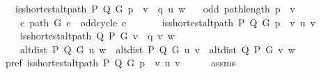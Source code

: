 \begin{isabellebody}
\ \ \ {\isachardoublequoteopen}is{\isacharunderscore}{\kern0pt}shortest{\isacharunderscore}{\kern0pt}alt{\isacharunderscore}{\kern0pt}path\ P\ Q\ G\ {\isacharparenleft}{\kern0pt}p\ {\isacharat}{\kern0pt}\ v\ {\isacharhash}{\kern0pt}\ q{\isacharparenright}{\kern0pt}\ u\ w{\isachardoublequoteclose}\isanewline
\ \ \ {\isachardoublequoteopen}odd\ {\isacharparenleft}{\kern0pt}path{\isacharunderscore}{\kern0pt}length\ {\isacharparenleft}{\kern0pt}p\ {\isacharat}{\kern0pt}\ {\isacharbrackleft}{\kern0pt}v{\isacharbrackright}{\kern0pt}{\isacharparenright}{\kern0pt}{\isacharparenright}{\kern0pt}{\isachardoublequoteclose}\isanewline
\ \ \ {\isachardoublequoteopen}{\isasymnot}\ {\isacharparenleft}{\kern0pt}{\isasymexists}c{\isachardot}{\kern0pt}\ path\ G\ c\ {\isasymand}\ odd{\isacharunderscore}{\kern0pt}cycle\ c{\isacharparenright}{\kern0pt}{\isachardoublequoteclose}\isanewline
\ \ \isanewline
\ \ \ \ {\isachardoublequoteopen}is{\isacharunderscore}{\kern0pt}shortest{\isacharunderscore}{\kern0pt}alt{\isacharunderscore}{\kern0pt}path\ P\ Q\ G\ {\isacharparenleft}{\kern0pt}p\ {\isacharat}{\kern0pt}\ {\isacharbrackleft}{\kern0pt}v{\isacharbrackright}{\kern0pt}{\isacharparenright}{\kern0pt}\ u\ v{\isachardoublequoteclose}\isanewline
\ \ \ \ {\isachardoublequoteopen}is{\isacharunderscore}{\kern0pt}shortest{\isacharunderscore}{\kern0pt}alt{\isacharunderscore}{\kern0pt}path\ Q\ P\ G\ {\isacharparenleft}{\kern0pt}v\ {\isacharhash}{\kern0pt}\ q{\isacharparenright}{\kern0pt}\ v\ w{\isachardoublequoteclose}\isanewline
\ \ \ \ {\isachardoublequoteopen}alt{\isacharunderscore}{\kern0pt}dist\ P\ Q\ G\ u\ w\ {\isacharequal}{\kern0pt}\ alt{\isacharunderscore}{\kern0pt}dist\ P\ Q\ G\ u\ v\ {\isacharplus}{\kern0pt}\ alt{\isacharunderscore}{\kern0pt}dist\ Q\ P\ G\ v\ w{\isachardoublequoteclose}%
\endisataginvisible
{\isafoldinvisible}%
%
\isadeliminvisible
\isanewline
%
\endisadeliminvisible
%
\isadelimproof
%
\endisadelimproof
%
\isatagproof
{}\isamarkupfalse%
\ {\isacharminus}{\kern0pt}\isanewline
\ \ \isamarkupfalse%
\ pref{\isacharcolon}{\kern0pt}\ {\isachardoublequoteopen}is{\isacharunderscore}{\kern0pt}shortest{\isacharunderscore}{\kern0pt}alt{\isacharunderscore}{\kern0pt}path\ P\ Q\ G\ {\isacharparenleft}{\kern0pt}p\ {\isacharat}{\kern0pt}\ {\isacharbrackleft}{\kern0pt}v{\isacharbrackright}{\kern0pt}{\isacharparenright}{\kern0pt}\ u\ v{\isachardoublequoteclose}\isanewline
\ \ \ \ \isamarkupfalse%
\ assms{\isacharparenleft}{\kern0pt}{}{\isacharcomma}{\kern0pt}\ {}{\isacharparenright}{\kern0pt}\isanewline

\end{isabellebody}
